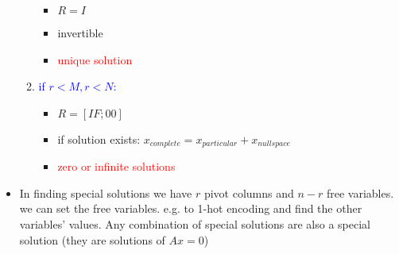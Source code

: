 \documentclass[a4paper,12pt]{article}
\newcommand{\blue}[1]{\textcolor{blue}{#1}}
\newcommand{\red}[1]{\textcolor{red}{#1}}
\begin{document}
\begin{itemize}
\begin{enumerate}
\begin{itemize}
\item $R = I$
\item invertible
\item \red{unique solution}
\end{itemize}
\item \blue{if $r < M, r < N$:}
\begin{itemize}
\item $R = [ I F; 0 0]$
\item if solution exists: $x_{complete} = x_{particular} + x_{nullspace}$
\item \red{zero or infinite solutions}
\end{itemize}
\end{enumerate}

\item In finding special solutions we have $r$ pivot columns and $n - r$ free variables.
we can set the free variables. e.g. to 1-hot encoding and find the other variables' values. Any combination of
special solutions are also a special solution (they are solutions of $Ax=0$)

\end{itemize}
\end{document}
